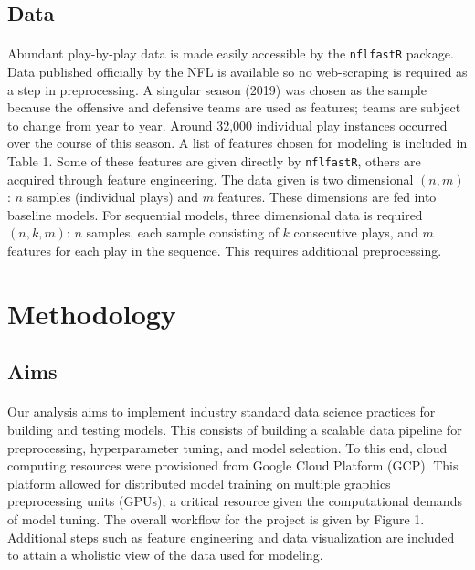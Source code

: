 \documentclass[11pt]{article}
\begin{document}
    \begin{multicols*}{2}
        \subsection{Data}
            \paragraph{}
                Abundant play-by-play data is made easily accessible by the \texttt{nflfastR} package. 
                Data published officially by the NFL is available so no web-scraping is required as a step in preprocessing.
                A singular season (2019) was chosen as the sample because the offensive and defensive teams are used as features; teams are subject to change from year to year. 
                Around 32,000 individual play instances occurred over the course of this season.  
                A list of features chosen for modeling is included in Table 1. 
                Some of these features are given directly by \texttt{nflfastR}, others are acquired through feature engineering.
                The data given is two dimensional $(n,m)$: $n$ samples (individual plays) and $m$ features. 
                These dimensions are fed into baseline models.
                For sequential models, three dimensional data is required $(n,k,m)$: $n$ samples, each sample consisting of $k$ consecutive plays, and $m$ features for each play in the sequence. 
                This requires additional preprocessing.

    \section{Methodology}

        \subsection{Aims}
            \paragraph{}
                Our analysis aims to implement industry standard data science practices for building and testing models.
                This consists of building a scalable data pipeline for preprocessing, hyperparameter tuning, and model selection.
                To this end, cloud computing resources were provisioned from Google Cloud Platform (GCP). 
                This platform allowed for distributed model training on multiple graphics preprocessing units (GPUs); a critical resource given the computational demands of model tuning.  
                The overall workflow for the project is given by Figure 1. 
                Additional steps such as feature engineering and data visualization are included to attain a wholistic view of the data used for modeling.
    
        \end{multicols*}
\end{document}
